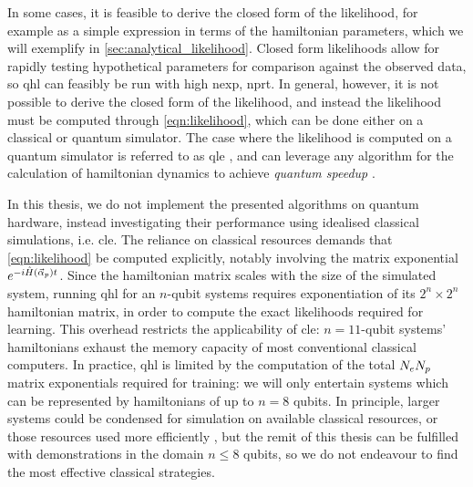 In some cases, it is feasible to derive the closed form of the \gls{likelihood}, 
    for example as a simple expression in terms of the \gls{hamiltonian} parameters, 
    which we will exemplify in \cref{sec:analytical_likelihood}. 
Closed form likelihoods allow for rapidly testing hypothetical parameters for comparison against 
    the observed data, so \gls{qhl} can feasibly be run with high \gls{nexp}, \gls{nprt}.  
In general, however, it is not possible to derive the closed form of the likelihood, 
    and instead the \gls{likelihood} must be computed through \cref{eqn:likelihood}, 
    which can be done either on a classical or quantum simulator. 
The case where the \gls{likelihood} is computed on a quantum simulator is referred to as \gls{qle}
    \cite{Wiebe:2014qhl, wang2017experimental},
    and can leverage any algorithm for the calculation of \gls{hamiltonian} dynamics to achieve \emph{quantum speedup}
    \cite{berry2015hamiltonian, childs2018toward}. %
\par 
In this thesis, we do not implement the presented algorithms on quantum hardware,
    instead investigating their performance using idealised classical simulations, i.e. \gls{cle}. 
The reliance on classical resources demands that \cref{eqn:likelihood} be computed explicitly, 
    notably involving the matrix exponential $e^{-i\hat{H}(\vec{\alpha}_p) t}$.
Since the \gls{hamiltonian} matrix scales with the size of the simulated system,
    running \gls{qhl} for an $n$-qubit systems requires exponentiation of its $2^n \times 2^n$ \gls{hamiltonian} matrix, 
    in order to compute the exact likelihoods required for learning. 
This overhead restricts the applicability of \gls{cle}: 
    $n=11$-qubit systems' \glspl{hamiltonian} exhaust the memory capacity of most conventional classical computers.
In practice, \gls{qhl} is limited by the computation of the total $N_eN_p$ matrix exponentials required for training:
    we will only entertain systems which can be represented by \glspl{hamiltonian} of up to $n=8$ qubits. 
In principle, larger systems could be condensed for simulation on available classical resources, 
    or those resources used more efficiently \cite{rudi2020approximating}, 
    but the remit of this thesis can be fulfilled with demonstrations in the domain $n\leq8$ qubits, 
    so we do not endeavour to find the most effective classical strategies.
\par 

